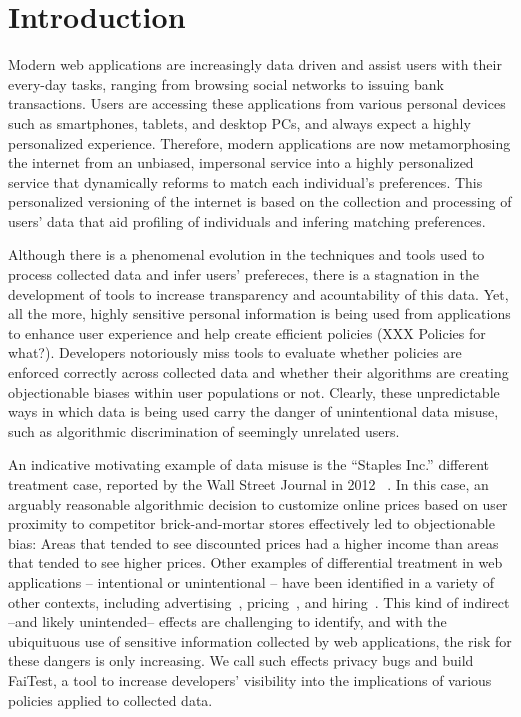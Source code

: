 
\section{Introduction}

Modern web applications are increasingly data driven and assist users
with their every-day tasks, ranging from browsing social networks to
issuing bank transactions. Users are accessing these applications from
various personal devices such as smartphones, tablets, and desktop PCs,
and always expect a highly personalized experience. Therefore, modern
applications are now metamorphosing the internet from an unbiased, impersonal
service into a highly personalized service that dynamically reforms to match
each individual's preferences. This personalized versioning of the internet
is based on the collection and processing of users' data that aid profiling
of individuals and infering matching preferences.

Although there is a phenomenal evolution in the techniques and tools used to
process collected data and infer users' prefereces, there is a stagnation
in the development of tools to increase transparency and acountability of
this data. Yet, all the more,  highly sensitive personal information is being
used from applications to enhance user experience and help create efficient
policies (XXX Policies for what?).
Developers notoriously miss tools to evaluate whether policies are
enforced correctly across collected data and whether their algorithms are
creating objectionable biases within user populations or not. Clearly,
these unpredictable ways in which data is being used carry the danger of
unintentional data misuse, such as algorithmic discrimination of seemingly
unrelated users.

An indicative motivating example of data misuse is the ``Staples Inc.''
different treatment case, reported by the Wall Street Journal in 2012
~\cite{Staples}. In this case, an arguably reasonable algorithmic decision
to customize online prices based on user proximity to competitor
brick-and-mortar stores effectively led to objectionable bias:
Areas that tended to see discounted prices had a higher income than areas
that tended to see higher prices. Other examples of differential treatment in
web applications – intentional or unintentional – have been identified in a
variety of other contexts, including advertising~\cite{}, pricing~\cite{},
and hiring~\cite{}. This kind of indirect --and likely unintended--
effects are challenging to identify, and with the ubiquituous use of sensitive
information collected by web applications, the risk for these dangers is only
increasing. We call such effects privacy bugs and build FaiTest,
a tool to increase developers’ visibility into the implications of various
policies applied to collected data.


